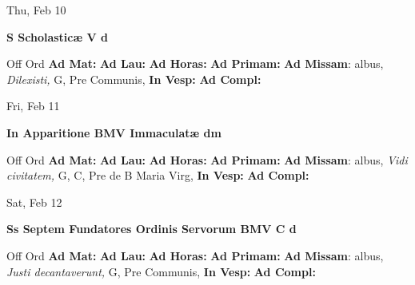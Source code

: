 \documentclass[10pt]{memoir}
\begin{document}
\begin{center}
\begin{minipage}{3.5in}
\vspace{2em}
\begin{center}Thu, Feb 10
\end{center}
\textbf{ \large S Scholasticæ V
\textnormal{\normalsize d}}

\begin{justify}Off Ord
\textbf{Ad Mat: }
\textbf{Ad Lau: }
\textbf{Ad Horas: }
\textbf{Ad Primam: }\textbf{Ad Missam}: albus, \textit{Dilexisti,} G, Pre Communis, 
\textbf{In Vesp: }
\textbf{Ad Compl: }
\end{justify}
\end{minipage}
\end{center}

\begin{center}
\begin{minipage}{3.5in}
\vspace{2em}
\begin{center}Fri, Feb 11
\end{center}
\textbf{ \large In Apparitione BMV Immaculatæ
\textnormal{\normalsize dm}}

\begin{justify}Off Ord
\textbf{Ad Mat: }
\textbf{Ad Lau: }
\textbf{Ad Horas: }
\textbf{Ad Primam: }\textbf{Ad Missam}: albus, \textit{Vidi civitatem,} G, C, Pre de B Maria Virg, 
\textbf{In Vesp: }
\textbf{Ad Compl: }
\end{justify}
\end{minipage}
\end{center}

\begin{center}
\begin{minipage}{3.5in}
\vspace{2em}
\begin{center}Sat, Feb 12
\end{center}
\textbf{ \large Ss Septem Fundatores Ordinis Servorum BMV C
\textnormal{\normalsize d}}

\begin{justify}Off Ord
\textbf{Ad Mat: }
\textbf{Ad Lau: }
\textbf{Ad Horas: }
\textbf{Ad Primam: }\textbf{Ad Missam}: albus, \textit{Justi decantaverunt,} G, Pre Communis, 
\textbf{In Vesp: }
\textbf{Ad Compl: }
\end{justify}
\end{minipage}
\end{center}
\end{document}
